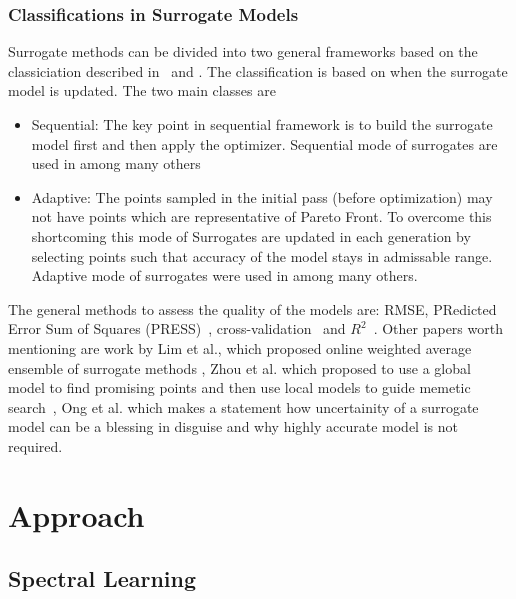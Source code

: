 \documentclass{newsig}
\begin{document}
\subsubsection{Classifications in Surrogate Models}
Surrogate methods can be divided into two general frameworks based on the classiciation described in~\cite{wang2007review} and \cite{liu2008novel}. The classification is based on when the surrogate model is updated. The two main classes are 
\begin{itemize}
\item{Sequential: The key point in sequential framework is to build the surrogate model first and then apply the optimizer. Sequential mode of surrogates are used in \cite{goel2007response, queipo2005surrogate, wilson2001efficient, liao2008multiobjective, su2011multi} among many others}

\item{Adaptive: The points sampled in the initial pass (before optimization) may not have points which are representative of Pareto Front. To overcome this shortcoming this mode of Surrogates are updated in each generation by selecting points such that accuracy of the model stays in admissable range. Adaptive mode of surrogates were used in \cite{zhou2007adaptive, gobbi2014local, khokhar2010performance, chen2012efficient} among many others.}
\end{itemize}
The general methods to assess the quality of the models are: RMSE, PRedicted Error Sum of
Squares (PRESS)~\cite{kutner2004applied}, cross-validation~\cite{shan2010survey} and $R^2$~\cite{li2010systematic}. Other papers worth mentioning are work by Lim et al., which proposed online weighted average ensemble of surrogate methods  \cite{lim2010generalizing}, Zhou et al. which proposed to use a global model to find promising points and then use local models to guide memetic search~\cite{zhou2007combining}, Ong et al. which makes a statement how uncertainity of a surrogate model can be a blessing in disguise and why highly accurate model is not required.




 
 \section{Approach}

\subsection{Spectral Learning}\label{sect:spect}
\end{document}
